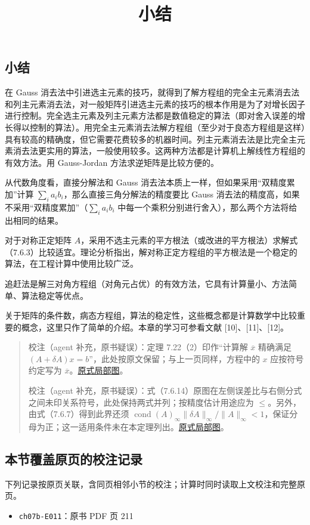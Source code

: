 \documentclass[
  10pt,
  fontset=fandol]{ctexart}
\title{小结}
\author{}
\date{}
\providecommand{\tightlist}{%
  \setlength{\itemsep}{0pt}\setlength{\parskip}{0pt}}
\begin{document}
\maketitle

\subsection{小结}\label{ux5c0fux7ed3}

在 Gauss 消去法中引进选主元素的技巧，就得到了解方程组的完全主元素消去法和列主元素消去法，对一般矩阵引进选主元素的技巧的根本作用是为了对增长因子进行控制。完全选主元素及列主元素方法都是数值稳定的算法（即对舍入误差的增长得以控制的算法）。用完全主元素消去法解方程组（至少对于良态方程组是这样）具有较高的精确度，但它需要花费较多的机器时间。列主元素消去法是比完全主元素消去法更实用的算法，一般使用较多。这两种方法都是计算机上解线性方程组的有效方法。用 Gauss-Jordan 方法求逆矩阵是比较方便的。

从代数角度看，直接分解法和 Gauss 消去法本质上一样，但如果采用``双精度累加''计算 \(\sum_i a_ib_i\)，那么直接三角分解法的精度要比 Gauss 消去法的精度高，如果不采用``双精度累加''（\(\sum_i a_ib_i\) 中每一个乘积分别进行舍入），那么两个方法将给出相同的结果。

对于对称正定矩阵 \(A\)，采用不选主元素的平方根法（或改进的平方根法）求解式（7.6.3）比较适宜。理论分析指出，解对称正定方程组的平方根法是一个稳定的算法，在工程计算中使用比较广泛。

追赶法是解三对角方程组（对角元占优）的有效方法，它具有计算量小、方法简单、算法稳定等优点。

关于矩阵的条件数，病态方程组，算法的稳定性，这些概念都是计算数学中比较重要的概念，这里只作了简单的介绍。本章的学习可参看文献 {[}10{]}、{[}11{]}、{[}12{]}。

\begin{quote}
校注（agent 补充，原书疑误）：定理 7.22（2）印作``计算解 \(\overline x\) 精确满足 \((A+\delta A)x=b\)''，此处按原文保留；与上一页同样，方程中的 \(x\) 应按符号约定写为 \(\overline x\)。\href{../assets/ch07b/211-computed-solution.png}{原式局部图}。

校注（agent 补充，原书疑误）：式（7.6.14）原图在左侧误差比与右侧分式之间未印关系符号，此处保持两式并列；按精度估计用途应为 \(\leqslant\)。另外，由式（7.6.7）得到此界还须 \(\operatorname{cond}(A)_\infty\|\delta A\|_\infty/\|A\|_\infty<1\)，保证分母为正；这一适用条件未在本定理列出。\href{../assets/ch07b/211-error-estimate.png}{原式局部图}。
\end{quote}

\subsection{本节覆盖原页的校注记录}\label{ux672cux8282ux8986ux76d6ux539fux9875ux7684ux6821ux6ce8ux8bb0ux5f55}

下列记录按原页关联，含同页相邻小节的校注；计算时同时读取上文校注和完整原页。

\begin{itemize}
\tightlist
\item
  \texttt{ch07b-E011}：原书 PDF 页 211
\end{itemize}
\end{document}
